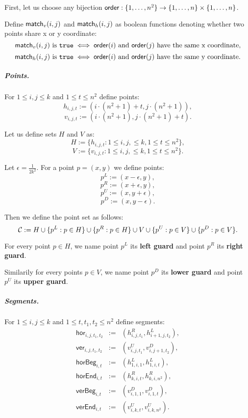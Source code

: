 First, let us choose any bijection
$\mathsf{order} : \{1, \ldots, n^2\} \rightarrow \{1, \ldots, n\} \times \{1, \ldots, n\}$.


Define $\mathsf{match}_v(i, j)$ and $\mathsf{match}_h(i, j)$
as boolean functions denoting whether two points share x or y coordinate:
$$\mathsf{match}_v(i, j) \text{ is } \texttt{true} \iff
\mathsf{order}(i) \text{ and } \mathsf{order}(j) \text{ have the same x coordinate,}$$
$$\mathsf{match}_h(i, j) \text{ is } \texttt{true} \iff
\mathsf{order}(i) \text{ and } \mathsf{order}(j) \text{ have the same y coordinate.}$$


\subparagraph{Points.}

For $1 \le i,j \le k$ and $1 \le t \le n^2$ define points:
	$$h_{i, j, t} := (i \cdot (n^2+1) + t, j \cdot (n^2+1)),$$
	$$v_{i, j, t} := (i \cdot (n^2+1), j \cdot (n^2+1) + t).$$
	
Let us define sets $H$ and $V$ as:
$$H := \{h_{i, j, t} : 1 \le i, j, \le k, 1 \le t \le n^2\},$$
$$V := \{v_{i, j, t} : 1 \le i, j, \le k, 1 \le t \le n^2\}.$$
	
Let $\epsilon = \frac{1}{2k^2}$.
For a point $p = (x, y)$ we define points:
$$p^{L} := (x - \epsilon, y),$$
$$p^{R} := (x + \epsilon, y),$$
$$p^{U} := (x, y + \epsilon),$$
$$p^{D} := (x, y - \epsilon).$$

Then we define the point set as follows:
$$\mathcal{C} := H \cup \{p^L : p \in H\} \cup \{p^R : p \in H\}
\cup V \cup \{p^U : p \in V\} \cup \{p^D : p \in V\}.$$

\begin{defi}
	\label{guard_def}
	For every point $p \in H$, we name point $p^L$ its \textbf{left guard}
	and point $p^R$ its \textbf{right guard}.
	
	Similarily for every points $p \in V$, we name point $p^D$ its \textbf{lower guard}
	and point $p^U$ its \textbf{upper guard}.
\end{defi}

\subparagraph{Segments.}
\newcommand{\hor}[4]{\mathsf{hor}_{#1,#2,#3,#4}}
\newcommand{\ver}[4]{\mathsf{ver}_{#1,#2,#3,#4}}
\newcommand{\horbeg}[2]{\mathsf{horBeg}_{#1,#2}}
\newcommand{\verbeg}[2]{\mathsf{verBeg}_{#1,#2}}
\newcommand{\horend}[2]{\mathsf{horEnd}_{#1,#2}}
\newcommand{\verend}[2]{\mathsf{verEnd}_{#1,#2}}

For $1 \le i,j \le k$ and $1 \le t, t_1, t_2 \le n^2$ define segments:
\begin{eqnarray*}
\hor{i}{j}{t_1}{t_2} & := & (h^R_{i,j,t_1}, h^L_{i+1, j, t_2}), \\
\ver{i}{j}{t_1}{t_2} & := & (v^U_{i,j,t_1}, v^D_{i, j+1, t_2}), \\
\horbeg{i}{t} & := & (h^L_{1, i, 1}, h^L_{1, i, t}), \\
\horend{i}{t} & := & (h^R_{k, i, t}, h^R_{k, i, n^2}), \\
\verbeg{i}{t} & := & (v^D_{i, 1, 1}, v^D_{i, 1, t}), \\
\verend{i}{t} & := & (v^U_{i, k, t}, v^U_{i, k, n^2}). \\
\end{eqnarray*}

